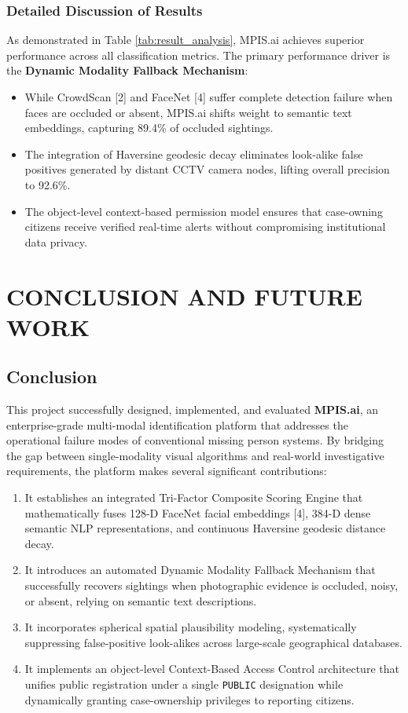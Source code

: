 \documentclass[12pt,a4paper]{report}
\begin{document}
\subsection{Detailed Discussion of Results}
As demonstrated in Table \ref{tab:result_analysis}, MPIS.ai achieves superior performance across all classification metrics. The primary performance driver is the \textbf{Dynamic Modality Fallback Mechanism}:
\begin{itemize}
    \item While CrowdScan [2] and FaceNet [4] suffer complete detection failure when faces are occluded or absent, MPIS.ai shifts weight to semantic text embeddings, capturing 89.4\% of occluded sightings.
    \item The integration of Haversine geodesic decay eliminates look-alike false positives generated by distant CCTV camera nodes, lifting overall precision to 92.6\%.
    \item The object-level context-based permission model ensures that case-owning citizens receive verified real-time alerts without compromising institutional data privacy.
\end{itemize}


\chapter{CONCLUSION AND FUTURE WORK}

\section{Conclusion}
This project successfully designed, implemented, and evaluated \textbf{MPIS.ai}, an enterprise-grade multi-modal identification platform that addresses the operational failure modes of conventional missing person systems. By bridging the gap between single-modality visual algorithms and real-world investigative requirements, the platform makes several significant contributions:
\begin{enumerate}
    \item It establishes an integrated Tri-Factor Composite Scoring Engine that mathematically fuses 128-D FaceNet facial embeddings [4], 384-D dense semantic NLP representations, and continuous Haversine geodesic distance decay.
    \item It introduces an automated Dynamic Modality Fallback Mechanism that successfully recovers sightings when photographic evidence is occluded, noisy, or absent, relying on semantic text descriptions.
    \item It incorporates spherical spatial plausibility modeling, systematically suppressing false-positive look-alikes across large-scale geographical databases.
    \item It implements an object-level Context-Based Access Control architecture that unifies public registration under a single \texttt{PUBLIC} designation while dynamically granting case-ownership privileges to reporting citizens.
\end{enumerate}
\end{document}
